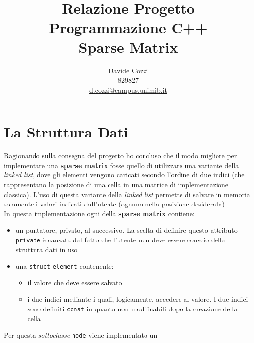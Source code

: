 \documentclass[a4paper,12pt, oneside]{article}
\title{Relazione Progetto\\
  Programmazione C++\\
  \large Sparse Matrix}
\author{Davide Cozzi\\
  829827\\
  \href{mailto:d.cozzi@campus.unimib.it}{d.cozzi@campus.unimib.it}}
\date{}
\begin{document}
\maketitle

\newtheorem{teorema}{Teorema}
\newtheorem{definizione}{Definizione}
\newtheorem{esempio}{Esempio}
\newtheorem{corollario}{Corollario}
\newtheorem{lemma}{Lemma}
\newtheorem{osservazione}{Osservazione}
\newtheorem{nota}{Nota}
\newtheorem{esercizio}{Esercizio}

\renewcommand{\chaptermark}[1]{%
  \markboth{\chaptername
    \ \thechapter.\ #1}{}}
\renewcommand{\sectionmark}[1]{\markright{\thesection.\ #1}}
\allsectionsfont{\centering}

\section*{La Struttura Dati}
Ragionando sulla consegna del progetto ho concluso che il modo
migliore per implementare una \textbf{sparse matrix} fosse quello di
utilizzare una variante della \textit{linked list}, dove gli elementi vengono
caricati secondo l'ordine di due indici (che rappresentano la
posizione di una cella in una matrice di implementazione
classica). L'uso di questa variante della \textit{linked list} permette di
salvare in memoria solamente i valori indicati dall'utente (ognuno
nella posizione desiderata).\\
In questa implementazione ogni  della \textbf{sparse matrix}
contiene:
\begin{itemize}
  \item un puntatore, privato, al  successivo. La scelta
  di definire questo attributo \texttt{private} è causata dal fatto
  che l'utente non deve essere conscio della struttura dati in uso
  \item una \texttt{struct} \texttt{element} contenente:
  \begin{itemize}

  \item il valore che deve essere salvato
  \item i due indici mediante i quali, logicamente, accedere al
  valore. I due indici sono definiti \texttt{const} in quanto non
  modificabili dopo la creazione della cella
  
  \end{itemize}
\end{itemize}
Per questa \textit{sottoclasse} \texttt{node} viene implementato un
\end{document}
